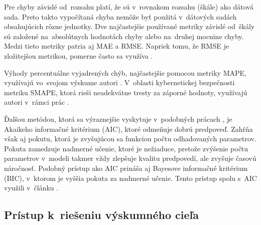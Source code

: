 \documentclass[thesismargins, thesislinespacing, openright, upjsfrontpage]{rnthesis}
\begin{document}
Pre chyby závislé od~rozsahu platí, že sú v~rovnakom rozsahu (škále) ako dátová sada. Preto takto vypočítaná chyba nemôže byť použitá v~dátových sadách obsahujúcich rôzne jednotky. Dve najčastejšie používané metriky závislé od~škály sú založené na~absolútnych hodnotách chyby alebo na~druhej mocnine chyby. Medzi tieto metriky patria aj MAE a RMSE. Napriek tomu, že RMSE je zložitejšou metrikou, pomerne často sa využíva \cite{tang2018disclosure,tang2017big,condon2008analysis}. 

Výhody percentuálne vyjadrených chýb, najčastejšie pomocou metriky MAPE, využívajú vo~svojom výskume autori \cite{jiang2004detecting,cortez2012multi,fang2019deep,tang2018disclosure,werner2017time}. V~oblasti kybernetickej bezpečnosti metriku SMAPE, ktorá rieši neadekvátne tresty za záporné hodnoty, využívajú autori v~rámci prác \cite{roumani2015time,pokhrel2017cybersecurity}.

Ďalšou metódou, ktorá sa výraznejšie vyskytuje v~podobných prácach \cite{tang2016exploiting,zhan2015predicting,wei2012intrusion}, je Akaikeho informačné kritérium (AIC), ktoré odmeňuje dobrú predpoveď. Zahŕňa však aj pokutu, ktorá je zvyšujúcou sa funkciou počtu odhadovaných parametrov. Pokuta zamedzuje nadmerné učenie, ktoré je nežiaduce, pretože zvýšenie počtu parametrov v~modeli takmer vždy zlepšuje kvalitu predpovedí, ale zvyšuje časovú náročnosť. Podobný prístup ako AIC prináša aj Bayesove informačné kritérium (BIC), v~ktorom je vyššia pokuta za nadmerné učenie. Tento prístup spolu s~AIC využili v~článku \cite{tang2016exploiting}.


\subsection{Prístup k~riešeniu výskumného cieľa}
 
\end{document}

